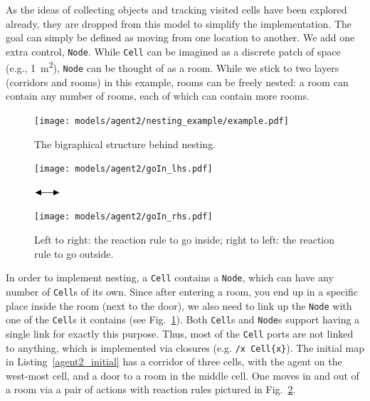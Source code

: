 \documentclass[runningheads]{llncs}
\providecommand\longrightdoublearrowRHD{\mathrel\LHD\joinrel\relbar\joinrel\relbar\joinrel\mathrel\RHD}
\begin{document}
As the ideas of collecting objects and tracking visited cells have been
explored already, they are dropped from this model to simplify the
implementation. The goal can simply be defined as moving from one location to
another. We add one extra control, \texttt{Node}. While \texttt{Cell} can be
imagined as a discrete patch of space (e.g., \SI{1}{\square\metre}),
\texttt{Node} can be thought of as a room. While we stick to two layers
(corridors and rooms) in this example, rooms can be freely nested: a room can
contain any number of rooms, each of which can contain more rooms.

\begin{figure}
  \centering
  \texttt{[image: models/agent2/nesting\_example/example.pdf]}
  \caption{The bigraphical structure behind nesting.}
  \label{agent2_nesting}
\end{figure}



\begin{figure}
  \centering
  \begin{minipage}{0.45\textwidth}
    \centering
    \texttt{[image: models/agent2/goIn\_lhs.pdf]}
  \end{minipage}
  $\longrightdoublearrowRHD$
  \begin{minipage}{0.45\textwidth}
    \centering
    \texttt{[image: models/agent2/goIn\_rhs.pdf]}
  \end{minipage}
  \caption{Left to right: the reaction rule to go inside; right to left: the
    reaction rule to go outside.}
  \label{go_in_out}
\end{figure}

In order to implement nesting, a \texttt{Cell} contains a \texttt{Node}, which
can have any number of \texttt{Cell}s of its own. Since after entering a room,
you end up in a specific place inside the room (next to the door), we also need
to link up the \texttt{Node} with one of the \texttt{Cell}s it contains (see
Fig.~\ref{agent2_nesting}). Both \texttt{Cell}s and \texttt{Node}s support
having a single link for exactly this purpose. Thus, most of the \texttt{Cell}
ports are not linked to anything, which is implemented via closures (e.g.
\texttt{/x Cell\{x\}}). The initial map in Listing~\ref{agent2_initial} has a
corridor of three cells, with the agent on the west-most cell, and a door to a
room in the middle cell. One moves in and out of a room via a pair of actions
with reaction rules pictured in Fig.~\ref{go_in_out}.
\end{document}
